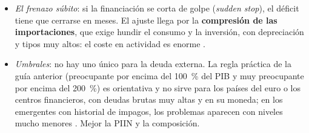 \documentclass[11pt]{article}
\begin{document}
\begin{itemize}
\begin{itemize}
  \item \emph{inflación} (ambigua): solo licúa la deuda emitida en moneda nacional;
  \item \emph{tipo de cambio} ($-$ si la deuda está en divisas): una depreciación la encarece; los emergentes que no pueden endeudarse fuera en su moneda () son los más expuestos \parencite{EHP2005PecadoOriginal};
  \item \emph{absorción interna} ($-$), entendida como $C+I+G$: cuanto más se gasta dentro, menos queda para pagar;
  \item \emph{acceso a los mercados} ($+$): sin él, el pago depende de la producción corriente.
  \end{itemize}
\item \emph{El frenazo súbito}: si la financiación se corta de golpe (\emph{sudden stop}), el déficit tiene que cerrarse en meses. El ajuste llega por la \textbf{compresión de las importaciones}, que exige hundir el consumo y la inversión, con depreciación y tipos muy altos: el coste en actividad es enorme \parencite{Calvo1998SuddenStops}.
\item \emph{Umbrales}: no hay uno único para la deuda externa. La regla práctica de la guía anterior (preocupante por encima del 100~\% del PIB y muy preocupante por encima del 200~\%) es orientativa y no sirve para los países del euro o los centros financieros, con deudas brutas muy altas y en su moneda; en los emergentes con historial de impagos, los problemas aparecen con niveles mucho menores \parencite{Reinhart2003Intolerancia}. Mejor la PIIN y la composición.
\end{itemize}
\end{document}
